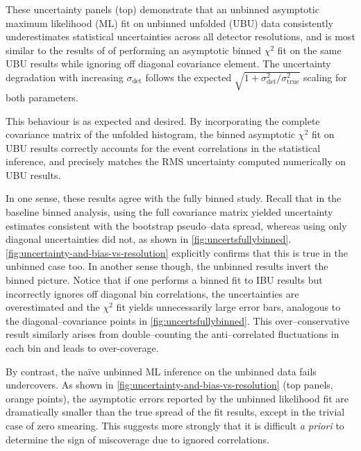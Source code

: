             These uncertainty panels (top) demonstrate that an unbinned asymptotic maximum likelihood (ML) fit on unbinned unfolded (UBU) data consistently underestimates statistical uncertainties across all detector resolutions, and is most similar to the results of of performing an asymptotic binned \(\chi^2\) fit on the same UBU results while ignoring off diagonal covariance element.
            The uncertainty degradation with increasing $\sigma_{\text{det}}$ follows the expected $\sqrt{1 + \sigma^2_{\text{det}}/\sigma^2_{\text{true}}}$ scaling for both parameters.

            This behaviour is as expected and desired.
            By incorporating the complete covariance matrix of the unfolded histogram, the binned asymptotic \(\chi^2\) fit on UBU results correctly accounts for the event correlations in the statistical inference, and precisely matches the RMS uncertainty computed numerically on UBU results.
            
            In one sense, these results agree with the fully binned study.
            Recall that in the baseline binned analysis, using the full covariance matrix yielded uncertainty estimates consistent with the bootstrap pseudo--data spread, whereas using only diagonal uncertainties did not, as shown in \cref{fig:uncertsfullybinned}.
            \cref{fig:uncertainty-and-bias-vs-resolution} explicitly confirms that this is true in the unbinned case too.
            In another sense though, the unbinned results invert the binned picture.
            Notice that if one performs a binned fit to IBU results but incorrectly ignores off diagonal bin correlations, the uncertainties are overestimated and the $\chi^2$ fit yields unnecessarily large error bars, analogous to the diagonal--covariance points in \cref{fig:uncertsfullybinned}.
            This over--conservative result similarly arises from double--counting the anti--correlated fluctuations in each bin and leads to over-coverage.
    
            By contrast, the na\"ive unbinned ML inference on the unbinned data fails undercovers.
            As shown in \cref{fig:uncertainty-and-bias-vs-resolution} (top panels, orange points), the asymptotic errors reported by the unbinned likelihood fit are dramatically smaller than the true spread of the fit results, except in the trivial case of zero smearing.
            This suggests more strongly that it is difficult \textit{a priori} to determine the sign of miscoverage due to ignored correlations.
            
